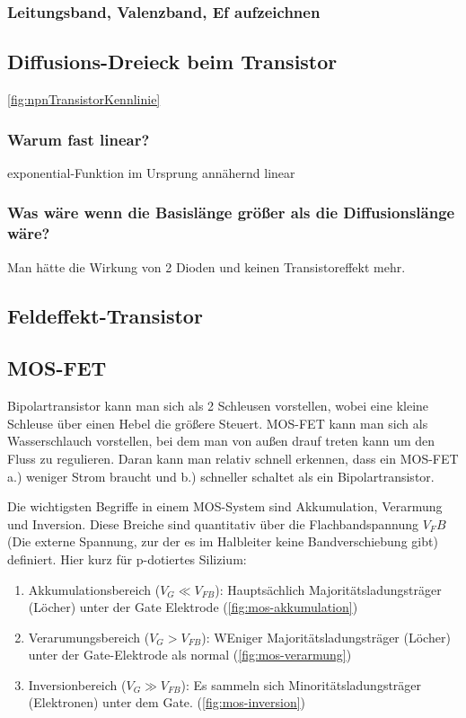     \subsubsection{Leitungsband, Valenzband, Ef aufzeichnen}

\subsection{Diffusions-Dreieck beim Transistor }\label{k6:diffusionsdreieck}

\autoref{fig:npnTransistorKennlinie}
    \subsubsection{Warum fast linear?} exponential-Funktion im Ursprung ann\"ahernd linear
    \subsubsection{Was w\"are wenn die Basisl\"ange gr\"o{\ss}er als die Diffusionsl\"ange w\"are?} Man h\"atte die Wirkung von 2 Dioden und keinen Transistoreffekt mehr.

\subsection{Feldeffekt-Transistor }\label{k6:fet}


\subsection{MOS-FET }\label{k6:mosfet}

Bipolartransistor kann man sich als 2 Schleusen vorstellen, wobei eine kleine Schleuse über einen Hebel die größere Steuert. 
MOS-FET kann man sich als Wasserschlauch vorstellen, bei dem man von außen drauf treten kann um den Fluss zu regulieren.
Daran kann man relativ schnell erkennen, dass ein MOS-FET a.) weniger Strom braucht und b.) schneller schaltet als ein Bipolartransistor. 

Die wichtigsten Begriffe in einem MOS-System sind Akkumulation, Verarmung und Inversion.
Diese Breiche sind quantitativ über die Flachbandspannung $V_FB$ (Die externe Spannung, zur der es im Halbleiter keine Bandverschiebung gibt) definiert. 
Hier kurz für p-dotiertes Silizium:
\begin{enumerate}
    \item Akkumulationsbereich ($V_G \ll V_{FB}$): Hauptsächlich Majoritätsladungsträger (Löcher) unter der Gate Elektrode (\autoref{fig:mos-akkumulation})
    \item Verarumungsbereich ($V_G > V_{FB}$): WEniger Majoritätsladungsträger (Löcher) unter der Gate-Elektrode als normal (\autoref{fig:mos-verarmung}) 
    \item Inversionbereich ($V_G \gg V_{FB}$): Es sammeln sich Minoritätsladungsträger (Elektronen) unter dem Gate. (\autoref{fig:mos-inversion}) 
\end{enumerate}

